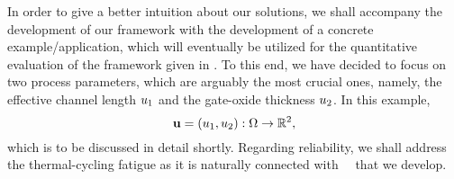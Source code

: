 In order to give a better intuition about our solutions, we shall accompany the development of our framework with the development of a concrete example/application, which will eventually be utilized for the quantitative evaluation of the framework given in .
To this end, we have decided to focus on two process parameters, which are arguably the most crucial ones, namely, the effective channel length $u_1$ and the gate-oxide thickness $u_2$.
In this example,
\begin{equation} \elab{application-uncertain-parameters}
  \vu = (\Leff, \Tox): \outcomes \to \real^2,
\end{equation}
which is to be discussed in detail shortly.
Regarding reliability, we shall address the thermal-cycling fatigue as it is naturally connected with \DSS\ \ta\ that we develop.
